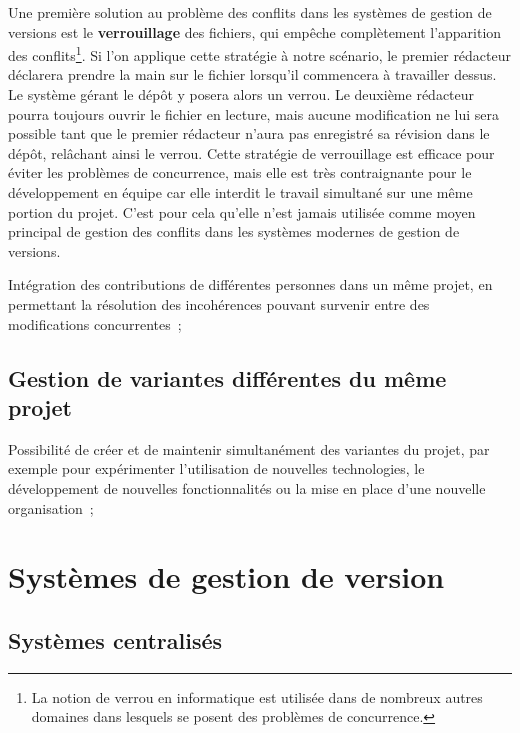 Une première solution au problème des conflits dans les systèmes de
gestion de versions est le \textbf{verrouillage} des
fichiers, qui empêche complètement l'apparition des
conflits\footnote{La notion de verrou en informatique est utilisée
  dans de nombreux autres domaines dans lesquels se posent des
  problèmes de concurrence.}. Si l'on applique cette stratégie à notre
scénario, le premier rédacteur déclarera prendre la main sur le
fichier lorsqu'il commencera à travailler dessus. Le système gérant le
dépôt y posera alors un verrou. Le deuxième rédacteur pourra toujours
ouvrir le fichier en lecture, mais aucune modification ne lui sera
possible tant que le premier rédacteur n'aura pas enregistré sa
révision dans le dépôt, relâchant ainsi le verrou. Cette stratégie de
verrouillage est efficace pour éviter les problèmes de concurrence,
mais elle est très contraignante pour le développement en équipe car
elle interdit le travail simultané sur une même portion du
projet. C'est pour cela qu'elle n'est jamais utilisée comme moyen
principal de gestion des conflits dans les systèmes modernes de
gestion de versions.

Intégration des contributions de différentes personnes dans un
  même projet, en permettant la résolution des incohérences pouvant
  survenir entre des modifications concurrentes~;



\subsection{Gestion de variantes différentes du même projet} %

Possibilité de créer et de maintenir simultanément des variantes du
projet, par exemple pour expérimenter l'utilisation de nouvelles
technologies, le développement de nouvelles fonctionnalités ou la mise
en place d'une nouvelle organisation~;

\section{Systèmes de gestion de version} %


\subsection{Systèmes centralisés} %

